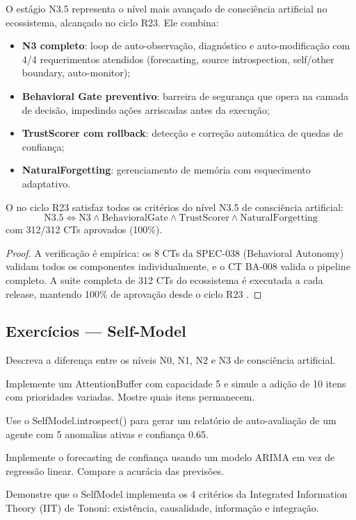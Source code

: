 O estágio N3.5 representa o nível mais avançado de consciência
artificial no ecossistema, alcançado no ciclo R23. Ele combina:

\begin{itemize}
\item \textbf{N3 completo}: loop de auto-observação, diagnóstico e
auto-modificação com 4/4 requerimentos atendidos (forecasting, source
introspection, self/other boundary, auto-monitor);
\item \textbf{Behavioral Gate preventivo}: barreira de segurança que
opera na camada de decisão, impedindo ações arriscadas antes da
execução;
\item \textbf{TrustScorer com rollback}: detecção e correção
automática de quedas de confiança;
\item \textbf{NaturalForgetting}: gerenciamento de memória com
esquecimento adaptativo.
\end{itemize}

\begin{teorema}[N3.5 Completo]
O \opencodeeco{} no ciclo R23 satisfaz todos os critérios do nível
N3.5 de consciência artificial:
\[
\text{N3.5} \iff \text{N3} \land \text{BehavioralGate} \land
\text{TrustScorer} \land \text{NaturalForgetting}
\]
com 312/312 CTs aprovados (100\%).
\end{teorema}
\begin{proof}
A verificação é empírica: os 8 CTs da SPEC-038 (Behavioral Autonomy)
validam todos os componentes individualmente, e o CT BA-008 valida o
pipeline completo. A suite completa de 312 CTs do ecossistema é
executada a cada release, mantendo 100\% de aprovação desde o ciclo
R23 \cite{opencode2026ecosystem}.
\end{proof}

\subsection{Exercícios — Self-Model}
\begin{exercicio}
Descreva a diferença entre os níveis N0, N1, N2 e N3 de consciência
artificial.
\end{exercicio}
\begin{exercicio}
Implemente um AttentionBuffer com capacidade 5 e simule a adição de
10 itens com prioridades variadas. Mostre quais itens permanecem.
\end{exercicio}
\begin{exercicio}
Use o SelfModel.introspect() para gerar um relatório de auto-avaliação
de um agente com 5 anomalias ativas e confiança 0.65.
\end{exercicio}
\begin{exercicio}
Implemente o forecasting de confiança usando um modelo ARIMA em vez
de regressão linear. Compare a acurácia das previsões.
\end{exercicio}
\begin{exercicio}
Demonstre que o SelfModel implementa os 4 critérios da Integrated
Information Theory (IIT) de Tononi: existência, causalidade,
informação e integração.
\end{exercicio}

